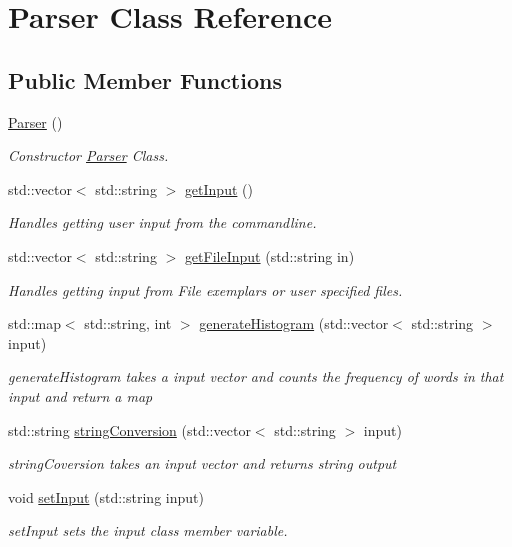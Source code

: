 \hypertarget{classParser}{\section{Parser Class Reference}
\label{classParser}
}
\subsection*{Public Member Functions}
\begin{DoxyCompactItemize}
\item 
\hypertarget{classParser_a12234f6cd36b61af4b50c94a179422c1}{\hyperlink{classParser_a12234f6cd36b61af4b50c94a179422c1}{Parser} ()}\label{classParser_a12234f6cd36b61af4b50c94a179422c1}

\begin{DoxyCompactList}\small\item\em Constructor \hyperlink{classParser}{Parser} Class. \end{DoxyCompactList}\item 
std\-::vector$<$ std\-::string $>$ \hyperlink{classParser_a28db3f32545756c9eec8a9bf74a8dad8}{get\-Input} ()
\begin{DoxyCompactList}\small\item\em Handles getting user input from the commandline. \end{DoxyCompactList}\item 
std\-::vector$<$ std\-::string $>$ \hyperlink{classParser_aa9014b8001ae933f1c26f692a155a029}{get\-File\-Input} (std\-::string in)
\begin{DoxyCompactList}\small\item\em Handles getting input from File exemplars or user specified files. \end{DoxyCompactList}\item 
std\-::map$<$ std\-::string, int $>$ \hyperlink{classParser_a53b6b2887c53a3fbedcd6df3cc1e69c8}{generate\-Histogram} (std\-::vector$<$ std\-::string $>$ input)
\begin{DoxyCompactList}\small\item\em generate\-Histogram takes a input vector and counts the frequency of words in that input and return a map \end{DoxyCompactList}\item 
std\-::string \hyperlink{classParser_a44db102220d866c9e6a690523e41d970}{string\-Conversion} (std\-::vector$<$ std\-::string $>$ input)
\begin{DoxyCompactList}\small\item\em string\-Coversion takes an input vector and returns string output \end{DoxyCompactList}\item 
void \hyperlink{classParser_ab605f89b56af8e8f35dcde402edac7e4}{set\-Input} (std\-::string input)
\begin{DoxyCompactList}\small\item\em set\-Input sets the input class member variable. \end{DoxyCompactList}\end{DoxyCompactItemize}


